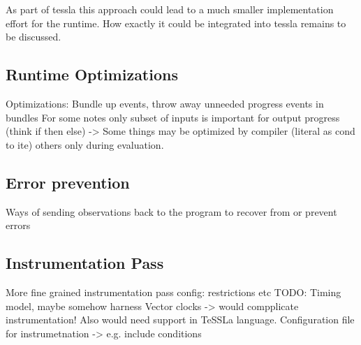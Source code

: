 As part of \gls{tessla} this approach could lead to a much smaller implementation effort for the runtime.
How exactly it could be integrated into \gls{tessla} remains to be discussed.

\subsection{Runtime Optimizations}
\label{sec:conclusion:further_work:runtime_optimizations}

Optimizations: Bundle up events, throw away unneeded progress events in  bundles
  For some notes only subset of inputs is important for output progress (think if then else)
    -> Some things may be optimized by compiler (literal as cond to ite) others only during evaluation.


\subsection{Error prevention}
\label{sec:conclusion:further_work:error_prevention}
Ways of sending observations back to the program to recover from or prevent errors


\subsection{Instrumentation Pass}
More fine grained instrumentation pass config: restrictions etc
TODO: Timing model, maybe somehow harness Vector clocks -> would  compplicate instrumentation! Also would need support in TeSSLa language.
Configuration file for instrumetnation -> e.g. include conditions
